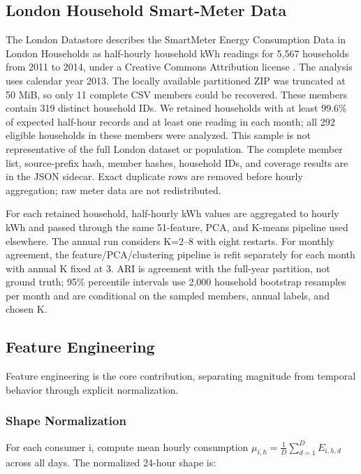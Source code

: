 \documentclass[11pt,a4paper]{article}
\begin{document}
\subsection{London Household Smart-Meter Data}
\label{sec:london_dataset}

The London Datastore describes the SmartMeter Energy Consumption Data in London Households as half-hourly household kWh readings for 5,567 households from 2011 to 2014, under a Creative Commons Attribution license \cite{london_smartmeter_datastore}. The analysis uses calendar year 2013. The locally available partitioned ZIP was truncated at 50 MiB, so only 11 complete CSV members could be recovered. These members contain 319 distinct household IDs. We retained households with at least 99.6\% of expected half-hour records and at least one reading in each month; all 292 eligible households in these members were analyzed. This sample is not representative of the full London dataset or population. The complete member list, source-prefix hash, member hashes, household IDs, and coverage results are in the JSON sidecar. Exact duplicate rows are removed before hourly aggregation; raw meter data are not redistributed.

For each retained household, half-hourly kWh values are aggregated to hourly kWh and passed through the same 51-feature, PCA, and K-means pipeline used elsewhere. The annual run considers K=2--8 with eight restarts. For monthly agreement, the feature/PCA/clustering pipeline is refit separately for each month with annual K fixed at 3. ARI is agreement with the full-year partition, not ground truth; 95\% percentile intervals use 2,000 household bootstrap resamples per month and are conditional on the sampled members, annual labels, and chosen K.

\subsection{Feature Engineering}
\label{sec:features}

Feature engineering is the core contribution, separating magnitude from temporal behavior through explicit normalization.

\subsubsection{Shape Normalization}

For each consumer i, compute mean hourly consumption $\mu_{i,h} = \frac{1}{D} \sum_{d=1}^{D} E_{i,h,d}$ across all days. The normalized 24-hour shape is:
\end{document}
